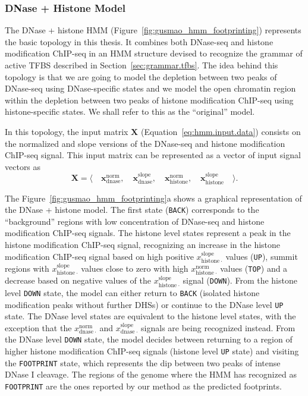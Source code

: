 \subsubsection{DNase + Histone Model}

The DNase + histone HMM (Figure~\ref{fig:gusmao_hmm_footprinting}) represents the basic topology in this thesis. It combines both DNase-seq and histone modification ChIP-seq in an HMM structure devised to recognize the grammar of active TFBS described in Section~\ref{sec:grammar.tfbs}. The idea behind this topology is that we are going to model the depletion between two peaks of DNase-seq using DNase-specific states and we model the open chromatin region within the depletion between two peaks of histone modification ChIP-seq using histone-specific states. We shall refer to this as the ``original'' model.

In this topology, the input matrix $\mathbf{X}$ (Equation~\ref{eq:hmm.input.data}) consists on the normalized and slope versions of the DNase-seq and histone modification ChIP-seq signal. This input matrix can be represented as a vector of input signal vectors as
\begin{equation}
  \label{eq:signal.m1}
  \mathbf{X} = \langle \quad \mathbf{x}^{\text{norm}}_{\text{dnase}} ,\quad \mathbf{x}^{\text{slope}}_{\text{dnase}} ,\quad \mathbf{x}^{\text{norm}}_{\text{histone}} ,\quad \mathbf{x}^{\text{slope}}_{\text{histone}} \quad \rangle .
\end{equation}

The Figure~\ref{fig:gusmao_hmm_footprinting}a shows a graphical representation of the DNase + histone model. The first state ({\tt BACK}) corresponds to the ``background'' regions with low concentration of DNase-seq and histone modification ChIP-seq signals. The histone level states represent a peak in the histone modification ChIP-seq signal, recognizing an increase in the histone modification ChIP-seq signal based on high positive $x^{\text{slope}}_{\text{histone}\ \cdot}$ values ({\tt UP}), summit regions with $x^{\text{slope}}_{\text{histone}\ \cdot}$ values close to zero with high $x^{\text{norm}}_{\text{histone}\ \cdot}$ values ({\tt TOP}) and a decrease based on negative values of the $x^{\text{slope}}_{\text{histone}\ \cdot}$ signal ({\tt DOWN}). From the histone level {\tt DOWN} state, the model can either return to {\tt BACK} (isolated histone modification peaks without further DHSs) or continue to the DNase level {\tt UP} state. The DNase level states are equivalent to the histone level states, with the exception that the $x^{\text{norm}}_{\text{dnase}\ \cdot}$ and $x^{\text{slope}}_{\text{dnase}\ \cdot}$ signals are being recognized instead. From the DNase level {\tt DOWN} state, the model decides between returning to a region of higher histone modification ChIP-seq signals (histone level {\tt UP} state) and visiting the {\tt FOOTPRINT} state, which represents the dip between two peaks of intense DNase I cleavage. The regions of the genome where the HMM has recognized as {\tt FOOTPRINT} are the ones reported by our method as the predicted footprints.

